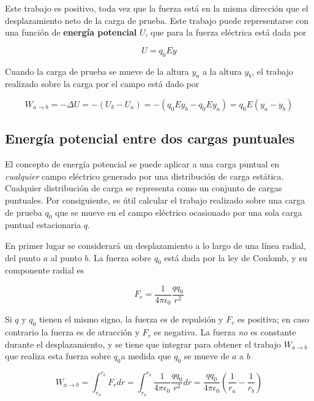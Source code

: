 Este trabajo es positivo, toda vez que la fuerza está en la misma dirección que el desplazamiento neto de la carga de prueba. Este trabajo puede representarse con una función de \textbf{energía potencial} $U$, que para la fuerza eléctrica está dada por

\begin{equation}\label{23.5}
U=q_0Ey
\end{equation}

Cuando la carga de prueba se mueve de la altura $y_a$ a la altura $y_b$, el trabajo realizado sobre la carga por el campo está dado por

\begin{equation}\label{23.6}
W_{a\to b}=-\Delta U=-(U_b-U_a)=-(q_0Ey_b-q_0Ey_a)=q_0E(y_a-y_b)
\end{equation}

\subsection{Energía potencial entre dos cargas puntuales}
El concepto de energía potencial se puede aplicar a una carga puntual en \textit{cualquier} campo eléctrico generado por una distribución de carga estática. 
Cualquier distribución de carga se representa como un conjunto de cargas puntuales. Por consiguiente, es útil calcular el trabajo realizado sobre una carga de prueba $q_0$ que se mueve en el campo eléctrico ocasionado por una sola carga puntual estacionaria $q$.

En primer lugar se considerará un desplazamiento a lo largo de una línea radial, del punto $a$ al punto $b$. La fuerza sobre $q_0$ está dada por la ley de Coulomb, y su componente radial es

\begin{equation}\label{23.7}
F_r=\frac{1}{4\pi\epsilon_0}\frac{qq_0}{r^2}
\end{equation}

Si $q$ y $q_0$ tienen el mismo signo, la fuerza es de repulsión y $F_r$ es positiva; en caso contrario la fuerza es de atracción y $F_r$ es negativa. La fuerza \textit{no} es constante durante el desplazamiento, y se tiene que integrar para obtener el trabajo $W_{a\to b}$ que realiza esta fuerza sobre $q_0$a medida que $q_0$ se mueve de $a$ a $b$

\begin{equation}\label{23.8}
W_{a\to b}=\int_{r_a}^{r_b}F_rdr=\int_{r_a}^{r_b}\frac{1}{4\pi\epsilon_0}\frac{qq_0}{r^2}dr=\frac{qq_0}{4\pi\epsilon_0}(\frac{1}{r_a}-\frac{1}{r_b})
\end{equation}

